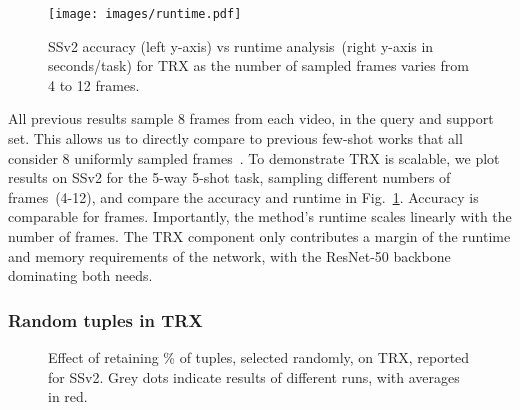\documentclass[final]{cvpr}
\begin{document}
\begin{figure}[t]
\centering 
\texttt{[image: images/runtime.pdf]}
\caption{SSv2 accuracy (left y-axis) vs runtime analysis~(right y-axis in seconds/task) for TRX  as the number of sampled frames varies from 4 to 12 frames.}
\label{fig:frames}
\end{figure}

All previous results sample 8 frames from each video, in the query and support set.
This
allows us to directly compare to previous few-shot works that all consider 8 uniformly sampled frames~\cite{Zhu2020,Bishay2019,Cao2020}. 
To demonstrate TRX is scalable, we plot  results on SSv2 for the 5-way 5-shot task, sampling different numbers of frames~(4-12), and compare the accuracy and runtime in Fig.~\ref{fig:frames}.
Accuracy is comparable for  frames. Importantly, the method's runtime scales linearly with the number of frames.
The TRX component only contributes a margin of the runtime and memory requirements of the network, with the ResNet-50 backbone dominating both needs.




\vspace*{-8pt}
\subsubsection{Random tuples in TRX}\label{sec:ablation_exhaustive}
\vspace*{-5pt}

\begin{figure}[t]
\centering
{}\hspace{0mm}
\hspace{0mm}
\hspace{0mm}
\vspace{-5pt}
\caption{Effect of retaining \% of tuples, selected randomly, on TRX, reported for SSv2.  Grey dots indicate results of different runs, with averages in red.\vspace{-5pt}}
\label{fig:drop_tuples}
\end{figure}
\end{document}
